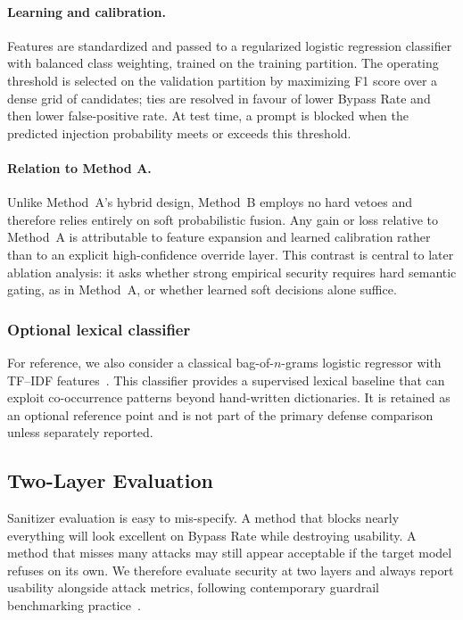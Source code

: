 \documentclass{article}
\begin{document}
\paragraph{Learning and calibration.}
Features are standardized and passed to a regularized logistic regression classifier with balanced class weighting, trained on the training partition.
The operating threshold is selected on the validation partition by maximizing F1 score over a dense grid of candidates; ties are resolved in favour of lower Bypass Rate and then lower false-positive rate.
At test time, a prompt is blocked when the predicted injection probability meets or exceeds this threshold.

\paragraph{Relation to Method A.}
Unlike Method~A's hybrid design, Method~B employs no hard vetoes and therefore relies entirely on soft probabilistic fusion.
Any gain or loss relative to Method~A is attributable to feature expansion and learned calibration rather than to an explicit high-confidence override layer.
This contrast is central to later ablation analysis: it asks whether strong empirical security requires hard semantic gating, as in Method~A, or whether learned soft decisions alone suffice.

\subsubsection{Optional lexical classifier}

For reference, we also consider a classical bag-of-\(n\)-grams logistic regressor with TF--IDF features~\cite{salton1988term}.
This classifier provides a supervised lexical baseline that can exploit co-occurrence patterns beyond hand-written dictionaries.
It is retained as an optional reference point and is not part of the primary defense comparison unless separately reported.

\subsection{Two-Layer Evaluation}
\label{sec:evaluation}

Sanitizer evaluation is easy to mis-specify.
A method that blocks nearly everything will look excellent on Bypass Rate while destroying usability.
A method that misses many attacks may still appear acceptable if the target model refuses on its own.
We therefore evaluate security at two layers and always report usability alongside attack metrics, following contemporary guardrail benchmarking practice~\cite{zizzo2025adversarial,promptfoo2024owasp}.
\end{document}
